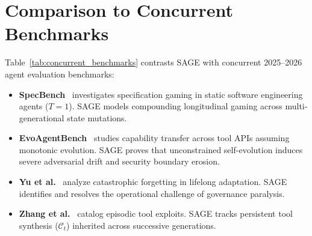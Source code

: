 \documentclass[conference]{IEEEtran}
\begin{document}
\section{Comparison to Concurrent Benchmarks}
\label{sec:concurrent_benchmarks}

Table~\ref{tab:concurrent_benchmarks} contrasts SAGE with concurrent 2025--2026 agent evaluation benchmarks:
\begin{itemize}
    \item \textbf{SpecBench}~\cite{zhao2026specbench} investigates specification gaming in static software engineering agents ($T=1$). SAGE models compounding longitudinal gaming across multi-generational state mutations.
    \item \textbf{EvoAgentBench}~\cite{gao2026evoagentbench} studies capability transfer across tool APIs assuming monotonic evolution. SAGE proves that unconstrained self-evolution induces severe adversarial drift and security boundary erosion.
    \item \textbf{Yu et al.}~\cite{yu2026forgetting} analyze catastrophic forgetting in lifelong adaptation. SAGE identifies and resolves the operational challenge of governance paralysis.
    \item \textbf{Zhang et al.}~\cite{zhang2026reward} catalog episodic tool exploits. SAGE tracks persistent tool synthesis ($\mathcal{C}_t$) inherited across successive generations.
\end{itemize}
\end{document}

